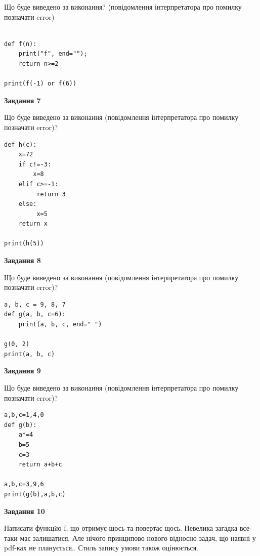 \documentclass[12pt, ukrainian]{article}
\begin{document}
{\begin {large}
Що буде виведено за виконання? (повідомлення інтерпретатора про помилку позначати error)\par
\begin{verbatim}

def f(n):
    print("f", end="");
    return n>=2

print(f(-1) or f(6))
\end{verbatim}

{\begin {center}\textbf{Завдання 7}\end {center}}

Що буде виведено за виконання (повідомлення інтерпретатора про помилку позначати error)?\par
\begin{verbatim}
def h(c):
    x=72
    if c!=-3: 
        x=8
    elif c>=-1:
         return 3
    else:
         x=5
    return x

print(h(5))
\end{verbatim}

{\begin {center}\textbf{Завдання 8}\end {center}}

Що буде виведено за виконання (повідомлення інтерпретатора про помилку позначати error)?\par
\begin{verbatim}
a, b, c = 9, 8, 7
def g(a, b, c=6):
    print(a, b, c, end=" ")

g(0, 2)
print(a, b, c)
\end{verbatim}

{\begin {center}\textbf{Завдання 9}\end {center}}

Що буде виведено за виконання (повідомлення інтерпретатора про помилку позначати error)?\par
\begin{verbatim}
a,b,c=1,4,0
def g(b):
    a*=4
    b=5
    c=3
    return a+b+c

a,b,c=3,9,6
print(g(b),a,b,c)
\end{verbatim}

{\begin {center}\textbf{Завдання 10}\end {center}}


Написати функцiю f, що отримує щось та повертає щось. Невелика загадка все-таки має залишатися. Але нічого принципово нового відносно задач, що наявні у pdf-ках не планується.. Стиль запису умови також оцінюється.\par
\end {large}}
\newpage
\end{document}
